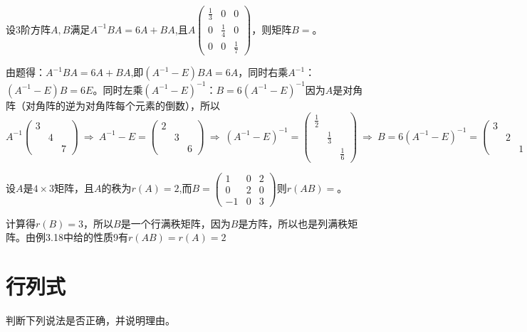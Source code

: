 \documentclass[a4paper]{report}
\begin{document}
\EX 设3阶方阵$A,B$满足$A^{-1}BA=6A+BA$,且$A
\begin{pmatrix}
\frac{1}{3}&0&0\\
0&\frac{1}{4}&0\\
0&0&\frac{1}{7}
\end{pmatrix}
$，则矩阵$B=$\underline{\hphantom{~~~~~~~~~~~}}。

\begin{jie}
由题得：$A^{-1}BA=6A+BA$,即$(A^{-1}-E)BA=6A$，同时右乘$A^{-1}$：$(A^{-1}-E)B=6E$。同时左乘$(A^{-1}-E)^{-1}$：$B=6(A^{-1}-E)^{-1}$因为$A$是对角阵（对角阵的逆为对角阵每个元素的倒数），所以
\begin{equation*}
A^{-1}
\begin{pmatrix}
3&&\\
&4&\\
&&7
\end{pmatrix}~\Rightarrow~A^{-1}-E=
\begin{pmatrix}
2&&\\
&3&\\
&&6
\end{pmatrix}~\Rightarrow~(A^{-1}-E)^{-1}=
\begin{pmatrix}
\frac{1}{2}&&\\
&\frac{1}{3}&\\
&&\frac{1}{6}
\end{pmatrix}~\Rightarrow~B=6(A^{-1}-E)^{-1}=
\begin{pmatrix}
3&&\\
&2&\\
&&1
\end{pmatrix}
\end{equation*}
\end{jie}

\EX 设$A$是$4\times 3$矩阵，且$A$的秩为$r(A)=2$,而$B=
\begin{pmatrix}
1&0&2\\
0&2&0\\
-1&0&3
\end{pmatrix}
$则$r(AB)=$\underline{\hphantom{~~~~~~~}}。

\begin{jie}
计算得$r(B)=3$，所以$B$是一个行满秩矩阵，因为$B$是方阵，所以也是列满秩矩阵。由例3.18中给的性质9有$r(AB)=r(A)=2$
\end{jie}

\clearpage
\section{行列式}
\EX 判断下列说法是否正确，并说明理由。
\end{document}
